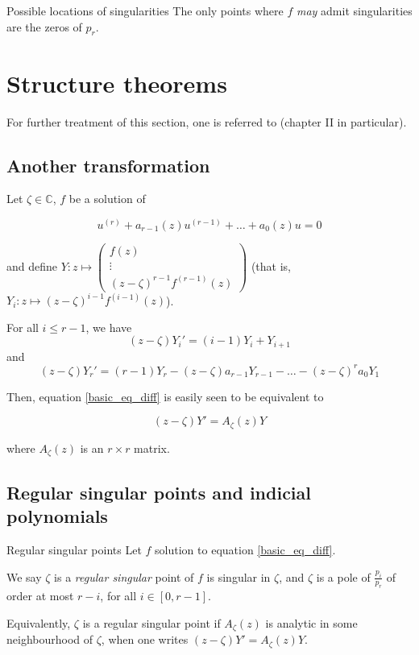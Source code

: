 \documentclass[../main.tex]{subfiles}
\begin{document}
\begin{cor}{Possible locations of singularities}\label{cor_sing_location}
	The only points where $f$ \emph{may} admit singularities are the zeros of $p_r$.
\end{cor}


\section{Structure theorems}

For further treatment of this section, one is referred to \cite{Wasow1965} (chapter II in particular).

\subsection{Another transformation}

Let $\zeta \in \mathbb{C}$, $f$ be a solution of

\begin{equation*}
	u^{(r)} + a_{r - 1}(z) u^{(r - 1)} + \dots + a_0(z) u = 0
\end{equation*}

and define $Y : z \mapsto \begin{pmatrix}
f(z)\\
\vdots \\
{(z - \zeta)}^{r - 1} f^{(r - 1)}(z)
\end{pmatrix}$ (that is, $Y_i : z \mapsto {(z - \zeta)}^{i - 1} f^{(i - 1)}(z)$).

For all $i \leq r - 1$, we have $${(z - \zeta)} Y_i' = (i-1)Y_i + Y_{i + 1}$$ and
$$ {(z - \zeta)} Y	_r' = (r - 1)Y_r - {(z - \zeta)} a_{r-1} Y_{r - 1} - \dots - {(z - \zeta)}^r a_0 Y_1 $$

Then, equation \eqref{basic_eq_diff} is easily seen to be equivalent to

\begin{equation}\label{eq_diff_matrix_form}
{(z - \zeta)}Y' = A_\zeta(z)Y
\end{equation}

where $A_\zeta(z)$ is an $r \times r$ matrix.

\subsection{Regular singular points and indicial polynomials}


\begin{definition}{Regular singular points}
	Let $f$ solution to equation \eqref{basic_eq_diff}.
	
	We say $\zeta$ is a \emph{regular singular} point of $f$ is singular in $\zeta$, and $\zeta$ is a pole of $\frac{p_i}{p_r}$ of order at most $r - i$, for all $i \in [0, r - 1]$.
	
	Equivalently, $\zeta$ is a regular singular point if $A_\zeta(z)$ is analytic in some neighbourhood of $\zeta$, when one writes $(z - \zeta)Y' = A_\zeta(z) Y$.
\end{definition}
\end{document}
